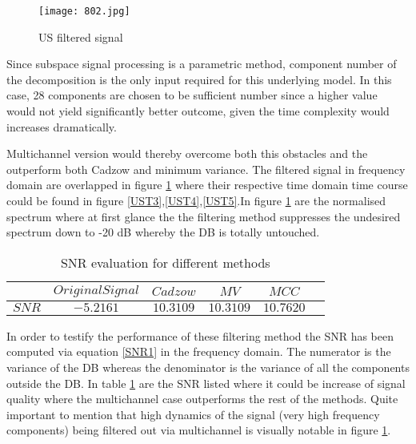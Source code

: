 \begin{figure}[!htbp]
\centering
\texttt{[image: 802.jpg]}
\caption{US filtered signal}\label{US3}
\end{figure}


Since subspace signal processing is a parametric method, component number of the decomposition is the only input required for this underlying model. In this case, 28 components are chosen to be sufficient number since a higher value would not yield significantly better outcome, given the time complexity would increases dramatically. 

Multichannel version would thereby overcome both this obstacles and the outperform both Cadzow and minimum variance. The filtered signal in frequency domain are overlapped in figure \ref{US3} where their respective time domain time course could be found in figure \ref{UST3},\ref{UST4},\ref{UST5}.In figure \ref{US3} are the normalised spectrum where at first glance the the filtering method suppresses the undesired spectrum down to -20 dB whereby the DB is totally untouched. 

\begin{table}[!htbp]
\centering
\caption{SNR evaluation for different methods}\label{tab12}
\begin{tabular}{c c c c c c} 
\hline 
$ $&$Original Signal$&$Cadzow$&$MV$&$MCC$ \\\hline 
            
$SNR$&$ -5.2161 $&$ 10.3109 $&$ 10.3109  $&$ 10.7620$\\
\hline 
\end{tabular}
\end{table}

In order to testify the performance of these filtering method the SNR has been computed via equation \ref{SNR1} in the frequency domain. The numerator is the variance of the DB whereas the denominator is the variance of all the components outside the DB. In table \ref{tab12} are the SNR listed where it could be increase of signal quality where the multichannel case outperforms the rest of the methods. Quite important to mention that high dynamics of the signal (very high frequency components) being filtered out via multichannel is visually notable in figure \ref{US3}.

